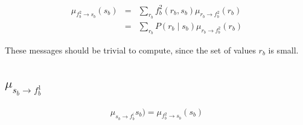 \documentclass[11pt]{article}
\newcommand{\fb}[1]{f_b^{#1}}
\newcommand{\mSbFb}[1]{\mu_{s_{b} \rightarrow \fb{#1}}}
\newcommand{\mFbSb}[1]{\mu_{ \fb{#1} \rightarrow s_{b}}}
\newcommand{\mRbFb}[1]{\mu_{ r_{b} \rightarrow  \fb{#1}}}
\begin{document}
\begin{eqnarray}
\mFbSb2(s_b) &=& \sum_{r_b} \fb2(r_b,s_b) \mRbFb2(r_b) \\
&=&  \sum_{r_b} P(r_b \mid s_b) \mRbFb2(r_b)
\end{eqnarray}

These messages should be trivial to compute, since the set of values $r_b$ is small.

\subsection{$\mSbFb1$}

\begin{eqnarray}
\mSbFb(s_b) = \mFbSb2(s_b)
\end{eqnarray}
\end{document}
